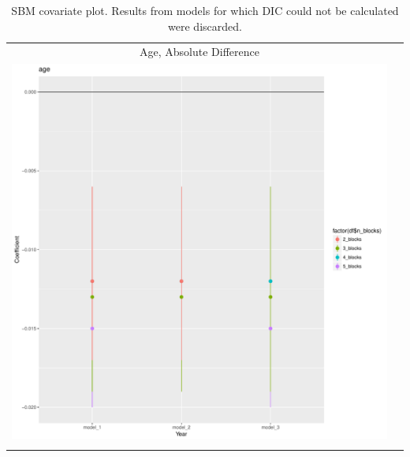 \documentclass[fleqn,12pt]{wlscirep}
\begin{document}
\clearpage
\begin{longtable}[!h]{c@{\hskip 0cm}c}
Age, Absolute Difference \\
\includegraphics[height=.75\textheight, clip=true, trim=.5cm .5cm 0cm .6cm]{figures/rl_plots1/age.pdf} \\
\caption{\label{fig:SBM_plot_pref} SBM covariate plot. Results from models for which DIC could not be calculated were discarded.}
\end{longtable}
\end{document}
